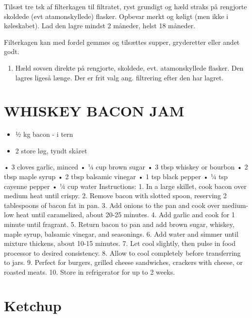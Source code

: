 \documentclass[
  letterpaper,
  DIV=11,
  numbers=noendperiod]{scrreprt}
\providecommand{\tightlist}{%
  \setlength{\itemsep}{0pt}\setlength{\parskip}{0pt}}\usepackage{longtable,booktabs,array}
\begin{document}
Tilsæt tre tsk af filterkagen til filtratet, ryst grundigt og hæld
straks på rengjorte skoldede (evt atamonskyllede) flasker. Opbevar mørkt
og køligt (men ikke i køleskabet). Lad den lagre mindst 2 måneder, helst
18 måneder.

Filterkagen kan med fordel gemmes og tilsættes supper, gryderetter eller
andet godt.

\begin{enumerate}
\def\labelenumi{\arabic{enumi}.}
\setcounter{enumi}{1}
\tightlist
\item
  Hæld sovsen direkte på rengjorte, skoldede, evt. atamonskyllede
  flasker. Den lagres ligeså længe. Der er frit valg ang. filtrering
  efter den har lagret.
\end{enumerate}

\hypertarget{whiskey-bacon-jam}{%
\section{WHISKEY BACON JAM}\label{whiskey-bacon-jam}}

\begin{itemize}
\tightlist
\item
  ½ kg bacon - i tern
\item
  2 store løg, tyndt skåret
\end{itemize}

• 3 cloves garlic, minced • ¼ cup brown sugar • 3 tbsp whiskey or
bourbon • 2 tbsp maple syrup • 2 tbsp balsamic vinegar • 1 tsp black
pepper • ¼ tsp cayenne pepper • ¼ cup water Instructions: 1. In a large
skillet, cook bacon over medium heat until crispy. 2. Remove bacon with
slotted spoon, reserving 2 tablespoons of bacon fat in pan. 3. Add
onions to the pan and cook over medium-low heat until caramelized, about
20-25 minutes. 4. Add garlic and cook for 1 minute until fragrant. 5.
Return bacon to pan and add brown sugar, whiskey, maple syrup, balsamic
vinegar, and seasonings. 6. Add water and simmer until mixture thickens,
about 10-15 minutes. 7. Let cool slightly, then pulse in food processor
to desired consistency. 8. Allow to cool completely before transferring
to jars. 9. Perfect for burgers, grilled cheese sandwiches, crackers
with cheese, or roasted meats. 10. Store in refrigerator for up to 2
weeks.

\hypertarget{ketchup}{%
\section{Ketchup}\label{ketchup}}
\end{document}
